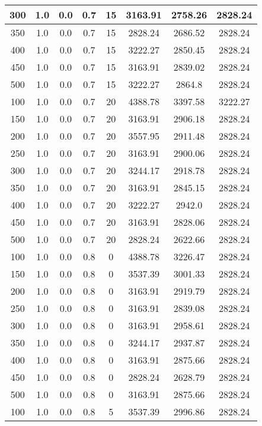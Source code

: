 \documentclass[a4paper, 12pt]{extreport}
\begin{document}
\begin{itemize}
\begin{longtable}{|c|c|c|c|c|c|c|c|}
			300 & 1.0 & 0.0 & 0.7 & 15 & 3163.91 & 2758.26 & 2828.24 \\\hline
			350 & 1.0 & 0.0 & 0.7 & 15 & 2828.24 & 2686.52 & 2828.24 \\\hline
			400 & 1.0 & 0.0 & 0.7 & 15 & 3222.27 & 2850.45 & 2828.24 \\\hline
			450 & 1.0 & 0.0 & 0.7 & 15 & 3163.91 & 2839.02 & 2828.24 \\\hline
			500 & 1.0 & 0.0 & 0.7 & 15 & 3222.27 & 2864.8 & 2828.24 \\\hline
			100 & 1.0 & 0.0 & 0.7 & 20 & 4388.78 & 3397.58 & 3222.27 \\\hline
			150 & 1.0 & 0.0 & 0.7 & 20 & 3163.91 & 2906.18 & 2828.24 \\\hline
			200 & 1.0 & 0.0 & 0.7 & 20 & 3557.95 & 2911.48 & 2828.24 \\\hline
			250 & 1.0 & 0.0 & 0.7 & 20 & 3163.91 & 2900.06 & 2828.24 \\\hline
			300 & 1.0 & 0.0 & 0.7 & 20 & 3244.17 & 2918.78 & 2828.24 \\\hline
			350 & 1.0 & 0.0 & 0.7 & 20 & 3163.91 & 2845.15 & 2828.24 \\\hline
			400 & 1.0 & 0.0 & 0.7 & 20 & 3222.27 & 2942.0 & 2828.24 \\\hline
			450 & 1.0 & 0.0 & 0.7 & 20 & 3163.91 & 2828.06 & 2828.24 \\\hline
			500 & 1.0 & 0.0 & 0.7 & 20 & 2828.24 & 2622.66 & 2828.24 \\\hline
			100 & 1.0 & 0.0 & 0.8 & 0 & 4388.78 & 3226.47 & 2828.24 \\\hline
			150 & 1.0 & 0.0 & 0.8 & 0 & 3537.39 & 3001.33 & 2828.24 \\\hline
			200 & 1.0 & 0.0 & 0.8 & 0 & 3163.91 & 2919.79 & 2828.24 \\\hline
			250 & 1.0 & 0.0 & 0.8 & 0 & 3163.91 & 2839.08 & 2828.24 \\\hline
			300 & 1.0 & 0.0 & 0.8 & 0 & 3163.91 & 2958.61 & 2828.24 \\\hline
			350 & 1.0 & 0.0 & 0.8 & 0 & 3244.17 & 2937.87 & 2828.24 \\\hline
			400 & 1.0 & 0.0 & 0.8 & 0 & 3163.91 & 2875.66 & 2828.24 \\\hline
			450 & 1.0 & 0.0 & 0.8 & 0 & 2828.24 & 2628.79 & 2828.24 \\\hline
			500 & 1.0 & 0.0 & 0.8 & 0 & 3163.91 & 2875.66 & 2828.24 \\\hline
			100 & 1.0 & 0.0 & 0.8 & 5 & 3537.39 & 2996.86 & 2828.24 \\\hline

\end{longtable}
\end{itemize}
\end{document}

